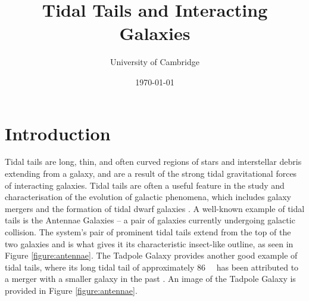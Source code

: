\documentclass[twoside,twocolumn]{article}
\title{Tidal Tails and Interacting Galaxies} %
\author{%
    \normalsize University of Cambridge \\ %
    }
\date{
    \today \\
} %
\begin{document}
\maketitle

\section{Introduction}
    Tidal tails are long, thin, and often curved regions of stars and interstellar debris extending from a galaxy, and are a result of the strong tidal gravitational forces of interacting galaxies. Tidal tails are often a useful feature in the study and characterisation of the evolution of galactic phenomena, which includes galaxy mergers and the formation of tidal dwarf galaxies \cite{alavi}. A well-known example of tidal tails is the Antennae Galaxies -- a pair of galaxies currently undergoing galactic collision. The system's pair of prominent tidal tails extend from the top of the two galaxies and is what gives it its characteristic insect-like outline, as seen in Figure \ref{figure:antennae}. The Tadpole Galaxy provides another good example of tidal tails, where its long tidal tail of approximately \SI{86}{\kilo\parsec} has been attributed to a merger with a smaller galaxy in the past \cite{tadpole}. An image of the Tadpole Galaxy is provided in Figure \ref{figure:antennae}.
    
\end{document}
